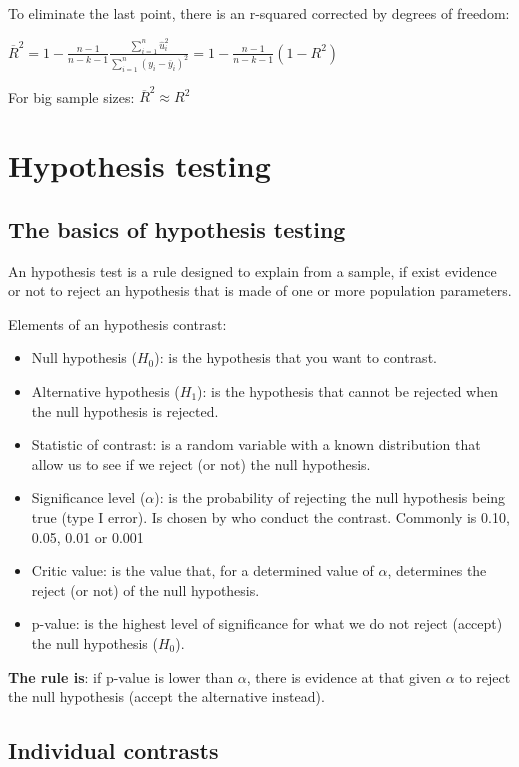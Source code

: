 \documentclass[10pt, a4paper, landscape]{extarticle}
\begin{document}
\begin{multicols}{3}
To eliminate the last point, there is an r-squared corrected by degrees of freedom:

$\overline{R}^2 = 1 - \frac{n-1}{n-k-1} \frac{\sum_{i=1}^n \hat{u}_i^2}{\sum_{i=1}^n (y_i - \overline{y}_i)^2} = 1 - \frac{n-1}{n-k-1} (1-R^2)$

For big sample sizes: $\overline{R}^2 \approx R^2$

\section*{Hypothesis testing}
\subsection*{The basics of hypothesis testing}

An hypothesis test is a rule designed to explain from a sample, if exist evidence or not to reject an hypothesis that is made of one or more population parameters.

Elements of an hypothesis contrast:

\begin{itemize}[leftmargin=*]
\item Null hypothesis ($H_0$): is the hypothesis that you want to contrast.
\item Alternative hypothesis ($H_1$): is the hypothesis that cannot be rejected when the null hypothesis is rejected.
\item Statistic of contrast: is a random variable with a known distribution that allow us to see if we reject (or not) the null hypothesis.
\item Significance level ($\alpha$): is the probability of rejecting the null hypothesis being true (type I error). Is chosen by who conduct the contrast. Commonly is 0.10, 0.05, 0.01 or 0.001
\item Critic value: is the value that, for a determined value of $\alpha$, determines the reject (or not) of the null hypothesis.
\item p-value: is the highest level of significance for what we do not reject (accept) the null hypothesis ($H_0$).
\end{itemize}

\textbf{The rule is}: if p-value is lower than $\alpha$, there is evidence at that given $\alpha$ to reject the null hypothesis (accept the alternative instead).

\subsection*{Individual contrasts}


\end{multicols}
\end{document}
